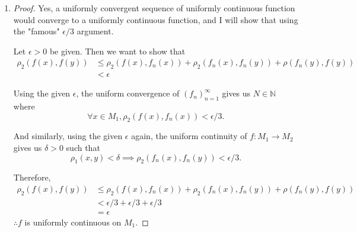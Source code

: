 \documentclass[12pt, a4paper]{article}
\newcommand{\seqn}[1]{(#1)^\infty_{n=1}}
\begin{document}
\begin{enumerate}
\begin{enumerate}
\begin{proof}
        Since $\delta=r\leq|x-y|$,

        \begin{align*}
          |g(x)-g(y)|
          &<(\frac{2|x-y|+\delta}{\delta})\epsilon\\
          &\leq(\frac{2|x-y|+|x-y|}{\delta})\epsilon\\
          &=(\frac{3\epsilon}{\delta})|x-y|
        \end{align*}

        and there we have it, $C=\frac{3\epsilon}{\delta}$.
      \end{proof}
    \end{enumerate}
  \item \begin{proof}
      Yes, a uniformly convergent sequence of uniformly continuous function
      would converge to a uniformly continuous function, and I will show that
      using the "famous" $\epsilon/3$ argument.

      Let $\epsilon>0$ be given. Then we want to show that
      \begin{align*}
        \rho_2(f(x),f(y))&\leq\rho_2(f(x), f_n(x))+\rho_2(f_n(x),f_n(y))+
        \rho(f_n(y),f(y))\\&<\epsilon
      \end{align*}

      Using the given $\epsilon$, the uniform convergence of $\seqn{f_n}$ gives
      us $N\in\mathbb{N}$ where
      \[ \forall x\in M_1,\rho_2(f(x),f_n(x)) < \epsilon/3.\]

      And similarly, using the given $\epsilon$ again, the uniform continuity of
      $f:M_1\rightarrow M_2$ gives us $\delta>0$ such that
      \[ \rho_1(x,y)<\delta \implies \rho_2(f_n(x),f_n(y)) < \epsilon/3.\]

      Therefore,
      \begin{align*}
        \rho_2(f(x),f(y))&\leq\rho_2(f(x), f_n(x))+\rho_2(f_n(x),f_n(y))+
        \rho(f_n(y),f(y))\\
        &< \epsilon/3 + \epsilon/3 + \epsilon/3\\
        &=\epsilon
      \end{align*}
      $\therefore f$ is uniformly continuous on $M_1$.
  \end{proof}
\end{enumerate}
\end{document}
